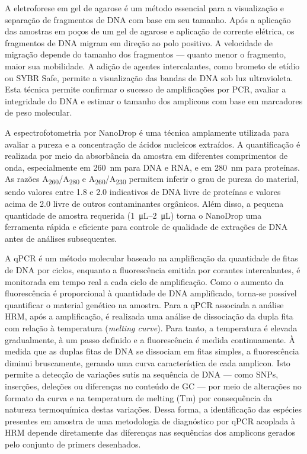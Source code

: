A eletroforese em gel de agarose é um método essencial para a visualização e
separação de fragmentos de DNA com base em seu tamanho.  Após a aplicação das
amostras em poços de um gel de agarose e aplicação de corrente elétrica, os
fragmentos de DNA migram em direção ao polo positivo. A velocidade de migração
depende do tamanho dos fragmentos — quanto menor o fragmento, maior sua
mobilidade.  A adição de agentes intercalantes, como brometo de etídio ou SYBR
Safe, permite a visualização das bandas de DNA sob luz ultravioleta.  Esta
técnica permite confirmar o sucesso de amplificações por PCR, avaliar a
integridade do DNA e estimar o tamanho dos amplicons com base em marcadores de
peso molecular\cite{costa1998leishmaniose}.

A espectrofotometria por NanoDrop é uma técnica amplamente utilizada para
avaliar a pureza e a concentração de ácidos nucleicos extraídos. A quantificação
é realizada por meio da absorbância da amostra em diferentes comprimentos de
onda, especialmente em \qty{260}{\nano\meter} para DNA e RNA, e em
\qty{280}{\nano\meter} para proteínas. As razões
A\textsubscript{260}/A\textsubscript{280} e
A\textsubscript{260}/A\textsubscript{230} permitem inferir o grau de pureza do
material, sendo valores entre \num{1.8} e \num{2.0} indicativos de DNA livre de
proteínas e valores acima de \num{2.0} livre de outros contaminantes
orgânicos\cite{nanodrop}. Além disso, a pequena quantidade de amostra requerida
(\qtyrange{1}{2}{\micro\liter}) torna o NanoDrop uma ferramenta rápida e
eficiente para controle de qualidade de extrações de DNA antes de análises
subsequentes.

A qPCR é um método molecular baseado na amplificação da quantidade de fitas de
DNA por ciclos, enquanto a fluorescência emitida por corantes intercalantes, é
monitorada em tempo real a cada ciclo de amplificação.  Como o aumento da
fluorescência é proporcional à quantidade de DNA amplificado, torna-se possível
quantificar o material genético na amostra\cite{Galluzi2018}.  Para a qPCR
associada a análise HRM, após a amplificação, é realizada uma análise de
dissociação da dupla fita com relação à temperatura (\textit{melting curve}).
Para tanto, a temperatura é elevada gradualmente, à um passo definido e a
fluorescência é medida continuamente. À medida que as duplas fitas de DNA se
dissociam em fitas simples, a fluorescência diminui bruscamente, gerando uma
curva característica de cada amplicon. Isto permite a detecção de variações
sutis na sequência de DNA — como SNPs, inserções, deleções ou diferenças no
conteúdo de GC — por meio de alterações no formato da curva e na temperatura de
melting (Tm)\cite{Wittwer2009} por consequência da natureza termoquímica destas
variações. Dessa forma, a identificação das espécies presentes em amostra de uma
metodologia de diagnóstico por qPCR acoplada à HRM depende diretamente das
diferenças nas sequências dos amplicons gerados pelo conjunto de primers
desenhados. 

